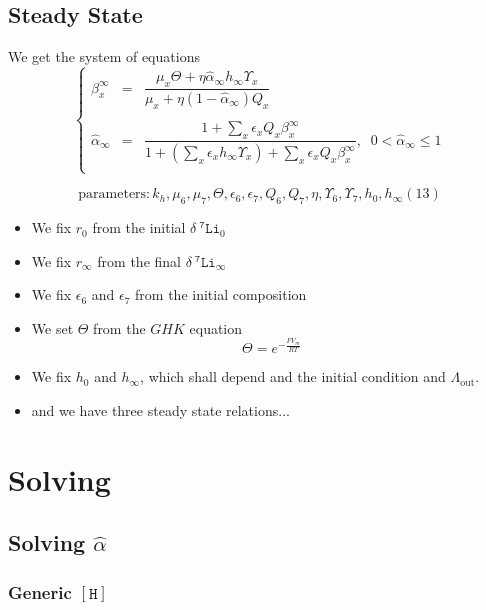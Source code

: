 \documentclass[aps,onecolumn,10pt]{revtex4}
\newcommand{\mychem}[1]{\mathtt{#1}}
\newcommand{\myconc}[1]{\left\lbrack{#1}\right\rbrack}
\newcommand{\spLi}[1]{{~^{\mychem{#1}}\mychem{Li}}}
\newcommand{\spproton}{\mychem{H}}
\newcommand{\proton}{\myconc{\spproton}}
\newcommand{\deltaLi}{ {\delta\!\!\!\spLi{7}} }
\newcommand{\LiAll}{\Lambda}
\newcommand{\LiAllOut}{{\LiAll}_{\mathrm{out}}}
\begin{document}
\subsection{Steady State}
We get the system of equations
\begin{equation}
\left\lbrace
\begin{array}{rcl}
	\beta_x^\infty & = & \dfrac{\mu_x\Theta + \eta \hat\alpha_\infty h_\infty \Upsilon_x}{\mu_x + \eta (1-\hat\alpha_\infty) Q_x}\\\
	\\
	\hat\alpha_\infty & = & \dfrac{1+\sum_x\epsilon_x Q_x\beta_x^\infty
	}{1 + \left(\sum_x \epsilon_x h_\infty \Upsilon_x \right) + \sum_x\epsilon_x Q_x\beta_x^\infty
	}, \;\; 0<\hat\alpha_\infty \leq 1\\\
\end{array}
\right.
\end{equation}

\begin{equation}
\text{parameters} : k_h, \mu_6, \mu_7, \Theta, \epsilon_6, \epsilon_7, Q_6, Q_7, \eta, \Upsilon_6, \Upsilon_7, h_0, h_\infty (13)
\end{equation}

\begin{itemize}
	\item We fix $r_0$ from the initial $\deltaLi_0$
	\item We fix $r_\infty$ from the final $\deltaLi_\infty$
	\item We fix $\epsilon_6$ and $\epsilon_7$ from the initial composition
	\item We set $\Theta$ from the $GHK$ equation
	$$
		\Theta = e^{ -\frac{FV_m}{RT} }
	$$
	\item We fix $h_0$ and $h_\infty$, which shall depend and the initial condition and $\LiAllOut$.
	\item and we have three steady state relations...
\end{itemize}

\section{Solving}
\color{blue}
\subsection{Solving $\hat\alpha$}

\subsubsection{Generic $\proton$}
\end{document}
